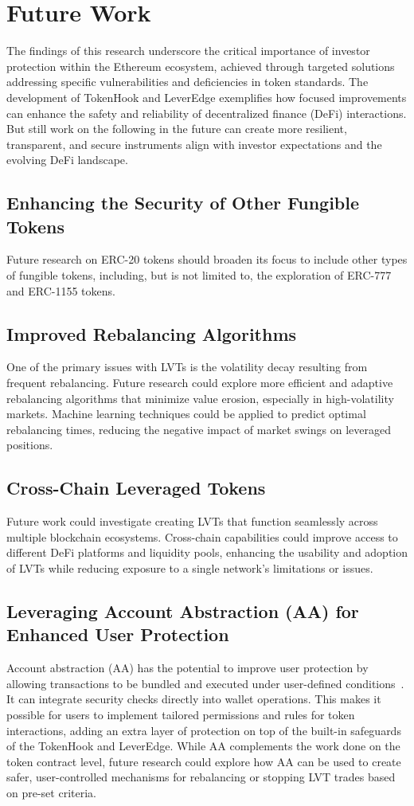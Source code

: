 \section{Future Work}
The findings of this research underscore the critical importance of investor protection within the Ethereum ecosystem, achieved through targeted solutions addressing specific vulnerabilities and deficiencies in token standards. The development of TokenHook and LeverEdge exemplifies how focused improvements can enhance the safety and reliability of decentralized finance (DeFi) interactions. But still work on the following in the future can create more resilient, transparent, and secure instruments align with investor expectations and the evolving DeFi landscape.

\subsection{Enhancing the Security of Other Fungible Tokens}
Future research on ERC-20 tokens should broaden its focus to include other types of fungible tokens, including, but is not limited to, the exploration of ERC-777 and ERC-1155 tokens.

\subsection{Improved Rebalancing Algorithms}
One of the primary issues with LVTs is the volatility decay resulting from frequent rebalancing. Future research could explore more efficient and adaptive rebalancing algorithms that minimize value erosion, especially in high-volatility markets. Machine learning techniques could be applied to predict optimal rebalancing times, reducing the negative impact of market swings on leveraged positions.

\subsection{Cross-Chain Leveraged Tokens}
Future work could investigate creating LVTs that function seamlessly across multiple blockchain ecosystems. Cross-chain capabilities could improve access to different DeFi platforms and liquidity pools, enhancing the usability and adoption of LVTs while reducing exposure to a single network's limitations or issues.

\subsection{Leveraging Account Abstraction (AA) for Enhanced User Protection}
Account abstraction (AA) has the potential to improve user protection by allowing transactions to be bundled and executed under user-defined conditions~\cite{Ethereum_AA}. It can integrate security checks directly into wallet operations. This makes it possible for users to implement tailored permissions and rules for token interactions, adding an extra layer of protection on top of the built-in safeguards of the TokenHook and LeverEdge. While AA complements the work done on the token contract level, future research could explore how AA can be used to create safer, user-controlled mechanisms for rebalancing or stopping LVT trades based on pre-set criteria.